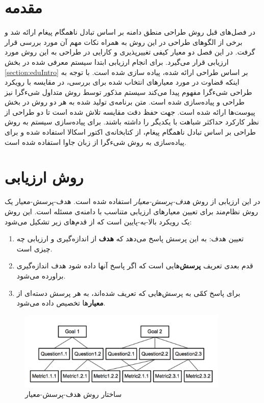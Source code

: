 \section{مقدمه}
در فصل‌های قبل روش طراحی منطق دامنه بر اساس تبادل ناهمگام پیغام ارائه شد و برخی از الگوهای طراحی در این روش به همراه نکات مهم آن مورد بررسی قرار گرفت. در این فصل دو معیار کیفی تغییرپذیری و کارایی در طراحی به این روش مورد ارزیابی قرار می‌گیرد. برای انجام ارزیابی ابتدا سیستم معرفی شده در بخش \ref{section:eduIntro} بر اساس طراحی ارائه شده، پیاده سازی شده است. با توجه به اینکه قضاوت در مورد معیارهای انتخاب شده برای بررسی، در مقایسه با رویکرد طراحی شیءگرا مفهوم پیدا می‌کند سیستم مذکور توسط روش متداول شیءگرا نیز طراحی و پیاده‌سازی شده است. متن برنامه‌ی تولید شده به هر دو روش در بخش پیوست‌ها ارائه شده است. جهت حفظ دقت مقایسه تلاش شده است تا دو طراحی از نظر کارکرد حداکثر شباهت با یکدیگر را داشته باشند. برای پیاده‌سازی سیستم به روش طراحی بر اساس تبادل ناهمگام پیغام، از کتابخانه‌ی اکتور اسکالا استفاده شده و برای پیاده‌سازی به روش شیءگرا از زبان جاوا استفاده شده است.
\section{روش ارزیابی}
در این ارزیابی از روش \textit{هدف-پرسش-معیار} استفاده شده است. هدف-پرسش-معیار یک روش نظام‌مند برای تعیین معیارهای ارزیابی متناسب با دامنه‌ی مسئله است. این روش یک رویکرد بالا-به-پایین است که از قدم‌های زیر تشکیل می‌شود:\cite{GQM}
\begin{enumerate}
\item تعیین هدف: به این پرسش پاسخ می‌دهد که \textbf{هدف} از اندازه‌گیری  و ارزیابی چه چیزی است.
\item قدم بعدی تعریف \textbf{پرسش‌}هایی است که اگر پاسخ آنها داده شود هدف اندازه‌گیری براورده می‌شود.
\item برای پاسخ کمّی به پرسش‌هایی که تعریف شده‌اند، به هر پرسش دسته‌ای از \textbf{معیار}ها تخصیص داده می‌شود.
\end{enumerate}

\begin{figure}[htb]
    \begin{center}
	\includegraphics[width=10cm]{5-Evaluation/Figures/gqm.pdf}
    \end{center}
    \caption{\label{fig:gqm} ساختار روش هدف-پرسش-معیار }
\end{figure}

